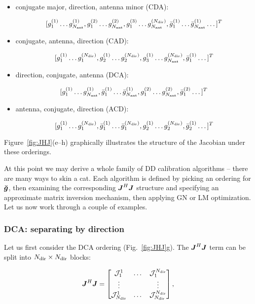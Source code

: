 \documentclass[useAMS,usenatbib]{mn2e}
\newcommand{\mat}[1]{{\bmath{#1}}}
\newcommand{\JJ}{\mat{J}} %
\newcommand{\JHJ}{\JJ^H\JJ} %
\begin{document}
\begin{itemize}
\item conjugate major, direction, antenna minor (CDA):

\[
[g^{(1)}_1 \dots g^{(1)}_{N_\mathrm{ant}}, g^{(2)}_1 \dots g^{(2)}_{N_\mathrm{ant}}, g^{(3)}_1 \dots g^{(N_\mathrm{dir})}_{N_\mathrm{ant}}, 
 \bar{g}^{(1)}_1 \dots \bar{g}^{(1)}_{N_\mathrm{ant}} \dots ]^T
\]

\item conjugate, antenna, direction (CAD):

\[
[g^{(1)}_1 \dots g^{(N_\mathrm{dir})}_1, g^{(1)}_2 \dots g^{(N_\mathrm{dir})}_2, g^{(1)}_3 \dots g^{(N_\mathrm{dir})}_{N_\mathrm{ant}}, 
 \bar{g}^{(1)}_1 \dots ]^T
\]

\item direction, conjugate, antenna (DCA):

\[
[g^{(1)}_1 \dots g^{(1)}_{N_\mathrm{ant}},\bar{g}^{(1)}_1 \dots \bar{g}^{(1)}_{N_\mathrm{ant}},
g^{(2)}_1 \dots g^{(2)}_{N_\mathrm{ant}}, \bar{g}^{(2)}_1 \dots ]^T
\]

\item antenna, conjugate, direction (ACD):

\[
[g^{(1)}_1 \dots g^{(N_\mathrm{dir})}_1,\bar{g}^{(1)}_1 \dots \bar{g}^{(N_\mathrm{dir})}_1,
g^{(1)}_2 \dots g^{(N_\mathrm{dir})}_2, \bar{g}^{(1)}_2 \dots ]^T
\]

\end{itemize}

Figure~\ref{fig:JHJ}(e--h) graphically illustrates the structure of the Jacobian under these orderings.

At this point we may derive a whole family of DD calibration algorithms -- there are many ways to skin a cat. Each 
algorithm is defined by picking an ordering for $\Gg$, then examining the corresponding $\JHJ$ structure and specifying 
an approximate matrix inversion mechanism, then applying GN or LM optimization. Let us now work through a couple of examples.

\subsubsection{DCA: separating by direction}
\label{sec:dca}

Let us first consider the DCA ordering (Fig.~\ref{fig:JHJ}g). The $\JHJ$ term can be split into $N_\mathrm{dir}\times N_\mathrm{dir}$ blocks:

\newcommand{\JJJ}{\mathcal{J}}

\begin{equation}
\label{eq:JHJ:DD:blocked}
\JHJ = \Matrix{ccc}{\JJJ^1_1 & \dots & \JJJ^{\Nd}_1 \\
\vdots & & \vdots \\
\JJJ_{\Nd}^1 & \dots & \JJJ_{\Nd}^{\Nd} },
\end{equation}
\end{document}
